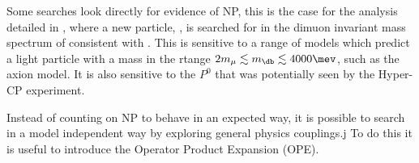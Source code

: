 Some searches look directly for evidence of NP, this is the case for the analysis detailed in
, where a new particle, \db, is searched for in the dimuon invariant mass spectrum of
\decay{\Bd}{\Kstarent\mumu} consistent with \decay{\db}{\mumu}.
This is sensitive to a range of models which predict a light particle with a mass in the rtange
$2m_\mu\lesssim m_\db\lesssim4000\mev$, such as the axion model.
It is also sensitive to the $P^0$ that was potentially seen by the Hyper-CP experiment.

Instead of counting on NP to behave in an expected way, it is possible to search in a model
independent way by exploring general physics couplings.j
To do this it is useful to introduce the Operator Product Expansion (OPE).


